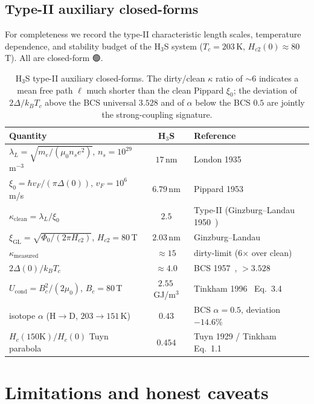 \documentclass[11pt,a4paper]{article}
\providecommand{\tierGreen}{🟢}
\begin{document}
\subsection{Type-II auxiliary closed-forms}
\label{sec:results-type2}

For completeness we record the type-II characteristic length scales,
temperature dependence, and stability budget of the H$_3$S system
(\(T_c=203\)\,K, \(H_{c2}(0)\approx 80\)\,T). All are closed-form
\tierGreen.

\begin{table}[h]
\centering
\small
\begin{tabular}{@{}lcl@{}}
\toprule
\textbf{Quantity} & \textbf{H$_3$S} & \textbf{Reference} \\
\midrule
$\lambda_L = \sqrt{m_e/(\mu_0 n_s e^2)}$, $n_s=10^{29}$ m$^{-3}$ & $17$\,nm & London 1935~\cite{london1935} \\
$\xi_0 = \hbar v_F/(\pi\Delta(0))$, $v_F=10^6$ m/s & $6.79$\,nm & Pippard 1953~\cite{pippard1953} \\
$\kappa_{\text{clean}} = \lambda_L/\xi_0$ & $2.5$ & Type-II (Ginzburg--Landau 1950~\cite{ginzburgLandau1950}) \\
$\xi_{\text{GL}} = \sqrt{\Phi_0/(2\pi H_{c2})}$, $H_{c2}=80$\,T & $2.03$\,nm & Ginzburg--Landau \\
$\kappa_{\text{measured}}$ & $\approx 15$ & dirty-limit (6$\times$ over clean) \\
$2\Delta(0)/k_B T_c$ & $\approx 4.0$ & BCS 1957~\cite{bcs1957}, $> 3.528$ \\
$U_{\text{cond}} = B_c^2/(2\mu_0)$, $B_c=80$\,T & $2.55$\,GJ/m$^3$ & Tinkham 1996~\cite{tinkham1996} Eq.~3.4 \\
isotope $\alpha$ (H$\to$D, $203\to 151$\,K) & $0.43$ & BCS $\alpha=0.5$, deviation $-14.6\%$ \\
$H_c(150\text{K})/H_c(0)$ Tuyn parabola & $0.454$ & Tuyn 1929 / Tinkham Eq.~1.1 \\
\bottomrule
\end{tabular}
\caption{H$_3$S type-II auxiliary closed-forms. The dirty/clean
$\kappa$ ratio of $\sim 6$ indicates a mean free path $\ell$ much
shorter than the clean Pippard $\xi_0$; the deviation of
$2\Delta/k_B T_c$ above the BCS universal $3.528$ and of $\alpha$
below the BCS $0.5$ are jointly the strong-coupling signature.}
\label{tab:type2}
\end{table}

\section{Limitations and honest caveats}
\label{sec:limits}
\end{document}
